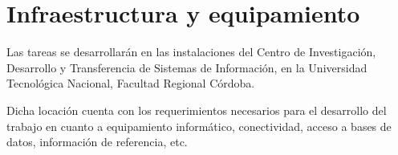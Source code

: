 \documentclass[
	11pt,oneside,a4paper,
	headsepline,footsepline,
	fleqn,
]{memoir}
\begin{document}
\section {Infraestructura y equipamiento}

Las tareas se desarrollarán en las instalaciones del Centro de Investigación, Desarrollo y Transferencia de Sistemas de Información, en la Universidad Tecnológica Nacional, Facultad Regional Córdoba.

Dicha locación cuenta con los requerimientos necesarios para el desarrollo del trabajo en cuanto a equipamiento informático, conectividad, acceso a bases de datos, información de referencia, etc.


\printbibliography[heading=subbibliography]

\end{document}
